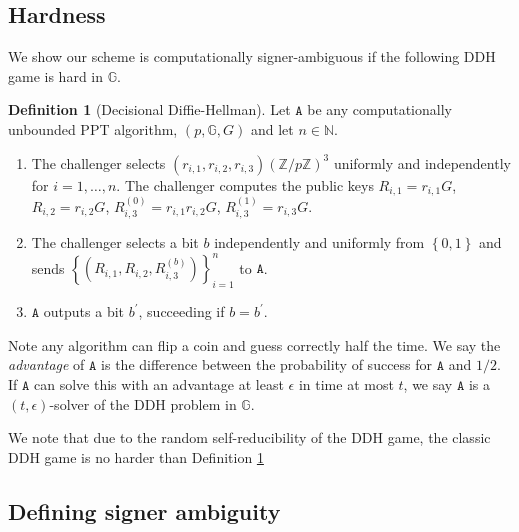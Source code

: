 \documentclass{mrl}
\theoremstyle{plain}
\theoremstyle{definition}
\newtheorem{defn}{Definition}[section]
\begin{document}
\subsection{Hardness}

We show our scheme is computationally signer-ambiguous if the following DDH game is hard in $\mathbb{G}$.

\begin{defn}[Decisional Diffie-Hellman]\label{ddhgame} Let $\texttt{A}$ be any computationally unbounded PPT algorithm, $(p, \mathbb{G}, G)$ and let $n \in \mathbb{N}$.
\begin{enumerate}
\item The challenger selects $(r_{i,1}, r_{i,2}, r_{i,3}) \left(\mathbb{Z}/p\mathbb{Z}\right)^3$ uniformly and independently for $i=1, \ldots, n$. The challenger computes the public keys $R_{i,1} = r_{i,1} G$, $R_{i,2} = r_{i,2}G$, $R_{i,3}^{(0)} = r_{i,1} r_{i,2} G$, $R_{i,3}^{(1)} = r_{i,3} G$.

\item The challenger selects a bit $b$ independently and uniformly from $\left\{0,1\right\}$ and sends $\left\{(R_{i,1}, R_{i,2}, R_{i,3}^{(b)})\right\}_{i=1}^{n}$ to $\texttt{A}$.

\item $\texttt{A}$ outputs a bit $b^\prime$, succeeding if $b = b^\prime$.
\end{enumerate}

Note any algorithm can flip a coin and guess correctly half the time. We say the \textit{advantage} of $\texttt{A}$ is the difference between the probability of success for $\texttt{A}$ and $1/2$. If $\texttt{A}$ can solve this with an advantage at least $\epsilon$ in time at most $t$, we say $\texttt{A}$ is a $(t,\epsilon)$-solver of the DDH problem in $\mathbb{G}$. 

\end{defn}


We note that due to the random self-reducibility of the DDH game, the classic DDH game is no harder than Definition \ref{ddhgame}
\subsection{Defining signer ambiguity}
\end{document}

